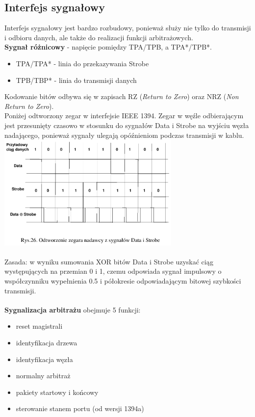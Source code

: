 \subsection{Interfejs sygnałowy}
Interfejs sygnałowy jest bardzo rozbudowy, ponieważ służy nie tylko do transmisji i odbioru danych, ale także do realizacji funkcji arbitrażowych.\\
\textbf{Sygnał różnicowy} - napięcie pomiędzy TPA/TPB, a TPA*/TPB*.\\
\begin{itemize}
	\item TPA/TPA* - linia do przekazywania Strobe
	\item TPB/TBP* - linia do transmisji danych
\end{itemize}
Kodowanie bitów odbywa się w zapisach RZ (\emph{Return to Zero}) oraz NRZ (\emph{Non Return to Zero}).\\
Poniżej odtworzony zegar w interfejsie IEEE 1394. Zegar w węźle odbierającym jest przesunięty czasowo w stosunku do sygnałów Data i Strobe na wyjściu węzła nadającego, ponieważ sygnały ulegają opóźnieniom podczas transmisji w kablu.\\
\includegraphics[width=9cm]{./wyklady/FIREWIRE_28_1.pdf}\\\\
Zasada: w wyniku sumowania XOR bitów Data i Strobe uzyskać ciąg występujących na przemian 0 i 1, czemu odpowiada sygnał impulsowy o współczynniku wypełnienia 0.5 i półokresie odpowiadającym bitowej szybkości transmisji.\\\\
\textbf{Sygnalizacja arbitrażu} obejmuje 5 funkcji:
\begin{itemize}
	\item reset magistrali
	\item identyfikacja drzewa
	\item identyfikacja węzła
	\item normalny arbitraż
	\item pakiety startowy i końcowy
	\item sterowanie stanem portu (od wersji 1394a)
\end{itemize}
